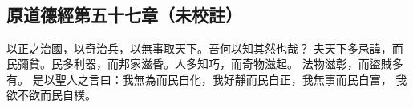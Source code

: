 ﻿%
%

\chapter{~}

\section{原道德經第五十七章（未校註）}

\begin{withgezhu}

\zhsong


以正之治國，以奇治兵，以無事取天下。吾何以知其然也哉？
夫天下多忌諱，而民彌貧。民多利器，而邦家滋昏。人多知巧，而奇物滋起。
\textcolor{tongjia-color}{法物滋彰}，而盜賊多有。
是以聖人之言曰：我無為而民自化，我好靜而民自正，我無事而民自富，
\textcolor{tongjia-color}{我欲不欲而民自樸}。

\end{withgezhu}
